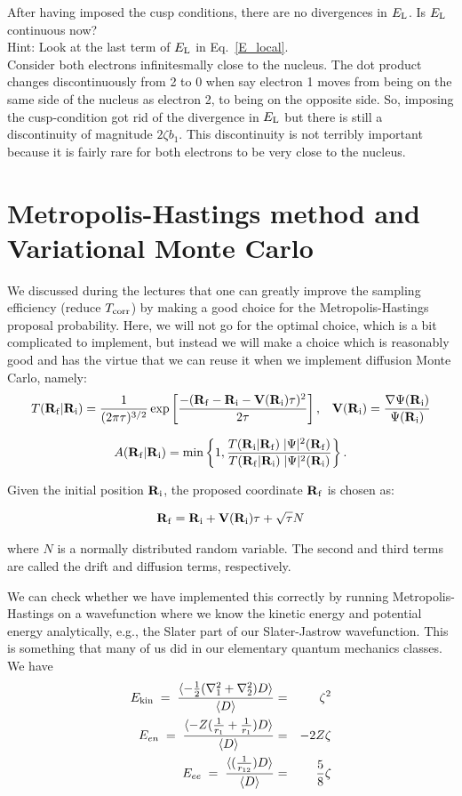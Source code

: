 \documentclass[11pt,aps,prb,amsmath,amssymb,superscriptaddress,notitlepage]{revtex4-1}
\def\beq{\begin{eqnarray}}
\def\eeq{\end{eqnarray}}
\def\EL{E_{\rm L}}
\def\Tcorr{T_{\rm corr}}
\begin{document}
{After having imposed the cusp conditions, there are no divergences in $\EL$.
Is $\EL$ continuous now? \\
Hint: Look at the last term of $\EL$ in Eq.~\ref{E_local}.\\
{\color{darkgreen} Consider both electrons infinitesmally close to the nucleus.  The dot product changes
discontinuously from 2 to 0 when say electron 1 moves from being on the same side of the nucleus as electron 2, to being
on the opposite side.  So, imposing the cusp-condition got rid of the divergence in $\EL$ but there is
still a discontinuity of magnitude $2 \zeta b_1$.  This discontinuity is not terribly important because it is fairly rare for both electrons
to be very close to the nucleus.}
}

\section{Metropolis-Hastings method and Variational Monte Carlo}

We discussed during the lectures that one can greatly improve the sampling efficiency (reduce $\Tcorr$) by
making a good choice for the Metropolis-Hastings proposal probability.  Here, we will not go for the
optimal choice, which is a bit complicated to implement, but instead we will make a choice which is reasonably
good and has the virtue that we can reuse it when we implement diffusion Monte Carlo, namely:
\beq
\Pfi = {1 \over (2 \pi \tau)^{3/2}} \exp\left[{-(\f - \i - \V(\Ri) \tau)^2 \over 2 \tau}\right], \;\;\; \V(\Ri) = {\nabla \PsiRi \over \PsiRi}
\label{DMC_proposal}
\eeq

\beq
\Afi = {\rm min}\left\{1,{\Pif\; \Psisq(\Rf) \over \Pfi\; \Psisq(\Ri)}\right\}.
\label{acceptance}
\eeq

Given the initial position ${{\bf R}\!\,_{\rm i}}$, the proposed coordinate ${{\bf R}\!\,_{\rm f}}$ is chosen as:

\beq
\f = \i + \V(\i)\tau + \sqrt{\tau} N
\label{proposed_coord}
\eeq

where $N$ is a normally distributed random variable. The second and third terms are called the drift and diffusion terms, respectively.

We can check whether we have implemented this correctly by running Metropolis-Hastings on a wavefunction
where we know the kinetic energy and potential energy analytically, e.g., the Slater part of our Slater-Jastrow
wavefunction.  This is something that many of us did in our elementary quantum mechanics classes.
We have
\beq
\label{E_kin}
E_{\rm kin} \;=\; {\langle -{1 \over 2} (\nabla_1^2 + \nabla_2^2) D \rangle \over \langle D \rangle} &=& \zeta^2 \\
\label{E_en}
E_{en}  \;=\; {\langle -Z ({1 \over r_1} +{1 \over r_1}) D \rangle \over \langle D \rangle} &=& -2 Z \zeta  \\
\label{E_ee}
E_{ee}  \;=\; {\langle ({1 \over r_{12}} ) D \rangle \over \langle D \rangle} &=& {5 \over 8} \zeta
\eeq
\end{document}
